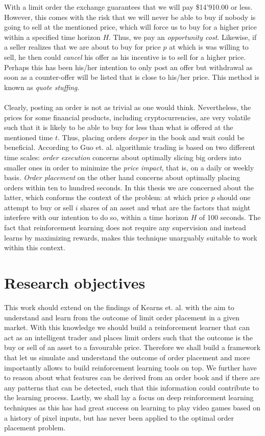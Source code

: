 With a limit order the exchange guarantees that we will pay \$14'910.00 or less.
However, this comes with the risk that we will never be able to buy if nobody is going to sell at the mentioned price, which will force us to buy for a higher price within a specified time horizon $H$.
Thus, we pay an \textit{opportunity cost}.
Likewise, if a seller realizes that we are about to buy for price $p$ at which is was willing to sell, he then could \textit{cancel} his offer as his incentive is to sell for a higher price.
Perhaps this has been his/her intention to only post an offer but withdrawal as soon as a counter-offer will be listed that is close to his/her price.
This method is known as \textit{quote stuffing}.
\\
\\
Clearly, posting an order is not as trivial as one would think.
Nevertheless, the prices for some financial products, including cryptocurrencies, are very volatile such that it is likely to be able to buy for less than what is offered at the mentioned time $t$.
Thus, placing orders \textit{deeper} in the book and wait could be beneficial.
According to Guo et. al. \cite{guo2013optimal} algorithmic trading is based on two different time scales: \textit{order execution} concerns about optimally slicing big orders into smaller ones in order to minimize the \textit{price impact}, that is, on a daily or weekly basis.
\textit{Order placement} on the other hand concerns about optimally placing orders within ten to hundred seconds. 
In this thesis we are concerned about the latter, which conforms the context of the problem: at which price $p$ should one attempt to buy or sell $i$ shares of an asset and what are the factors that might interfere with our intention to do so, within a time horizon $H$ of 100 seconds.
The fact that reinforcement learning does not require any supervision and instead learns by maximizing rewards, makes this technique unarguably suitable to work within this context.

\section{Research objectives}

This work should extend on the findings of Kearns et. al. \cite{nevmyvaka2006reinforcement} with the aim to understand and learn from the outcome of limit order placement in a given market.
With this knowledge we should build a reinforcement learner that can act as an intelligent trader and places limit orders such that the outcome is the buy or sell of an asset to a favourable price.
Therefore we shall build a framework that let us simulate and understand the outcome of order placement and more importantly allows to build reinforcement learning tools on top.
We further have to reason about what features can be derived from an order book and if there are any patterns that can be detected, such that this information could contribute to the learning process.
Lastly, we shall lay a focus on deep reinforcement learning techniques as this has had great success on learning to play video games \cite{mnih2013playing} based on a history of pixel inputs, but has never been applied to the optimal order placement problem.

